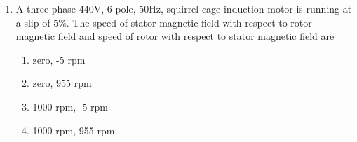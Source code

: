 \documentclass[journal]{IEEEtran}
\begin{document}
\begin{enumerate}[start=27]
\item A three-phase 440V, 6 pole, 50Hz, squirrel cage induction motor is running at a slip of 5\%. The speed of stator magnetic field with respect to rotor magnetic field and speed of rotor with respect to stator magnetic field are
\begin{multicols}{2}
\begin{enumerate}
\item zero, -5 rpm
\item  zero, 955 rpm
\item  1000 rpm, -5 rpm
\item 1000 rpm, 955 rpm
\end{enumerate}
\end{multicols}



\end{enumerate}
\end{document}

